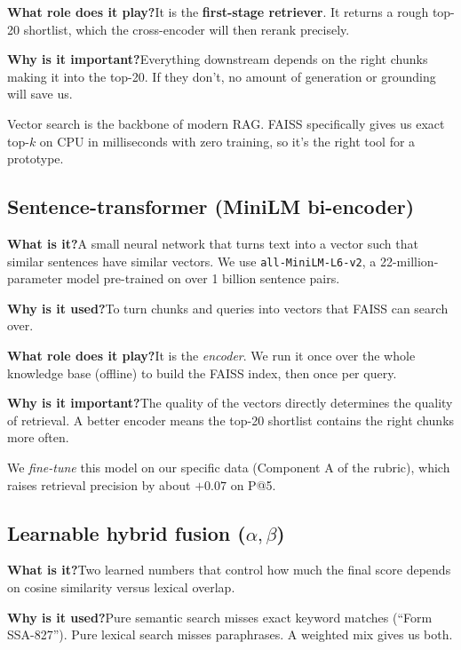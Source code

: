 \documentclass[11pt,a4paper]{article}
\begin{document}
\textbf{What role does it play?}\quad It is the \textbf{first-stage retriever}. It returns a rough top-20 shortlist, which the cross-encoder will then rerank precisely.

\textbf{Why is it important?}\quad Everything downstream depends on the right chunks making it into the top-20. If they don't, no amount of generation or grounding will save us.

\begin{why}
Vector search is the backbone of modern RAG. FAISS specifically gives us exact top-$k$ on CPU in milliseconds with zero training, so it's the right tool for a prototype.
\end{why}

\subsection{Sentence-transformer (MiniLM bi-encoder)}

\textbf{What is it?}\quad A small neural network that turns text into a vector such that similar sentences have similar vectors. We use \texttt{all-MiniLM-L6-v2}, a 22-million-parameter model pre-trained on over 1 billion sentence pairs.

\textbf{Why is it used?}\quad To turn chunks and queries into vectors that FAISS can search over.

\textbf{What role does it play?}\quad It is the \emph{encoder}. We run it once over the whole knowledge base (offline) to build the FAISS index, then once per query.

\textbf{Why is it important?}\quad The quality of the vectors directly determines the quality of retrieval. A better encoder means the top-20 shortlist contains the right chunks more often.

We \emph{fine-tune} this model on our specific data (Component A of the rubric), which raises retrieval precision by about $+0.07$ on P@5.

\subsection{Learnable hybrid fusion ($\alpha, \beta$)}
\label{sec:component-retriever}

\textbf{What is it?}\quad Two learned numbers that control how much the final score depends on cosine similarity versus lexical overlap.

\textbf{Why is it used?}\quad Pure semantic search misses exact keyword matches (``Form SSA-827''). Pure lexical search misses paraphrases. A weighted mix gives us both.
\end{document}
